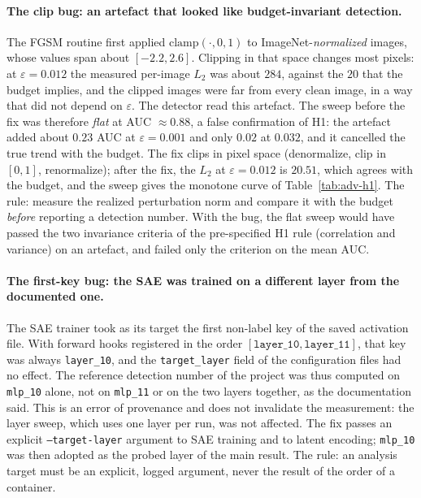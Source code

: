 \documentclass[../ppgc-tese.tex]{subfiles}
\begin{document}
\paragraph*{The clip bug: an artefact that looked like budget-invariant
detection.}
The FGSM routine first applied $\mathrm{clamp}(\cdot, 0, 1)$ to
ImageNet-\emph{normalized} images, whose values span about $[-2.2, 2.6]$.
Clipping in that space changes most pixels: at $\varepsilon{=}0.012$ the
measured per-image $L_2$ was about $284$, against the $20$ that the budget
implies, and the clipped images were far from every clean image, in a way that
did not depend on $\varepsilon$. The detector read this artefact. The sweep
before the fix was therefore \emph{flat} at AUC $\approx 0.88$, a false
confirmation of H1: the artefact added about $0.23$ AUC at
$\varepsilon{=}0.001$ and only $0.02$ at $0.032$, and it cancelled the true
trend with the budget.
The fix clips in pixel space (denormalize, clip in $[0,1]$, renormalize);
after the fix, the $L_2$ at $\varepsilon{=}0.012$ is $20.51$, which agrees
with the budget, and the sweep gives the monotone curve of
Table~\ref{tab:adv-h1}.
The rule: measure the realized perturbation norm and compare it with the
budget \emph{before} reporting a detection number. With the bug, the flat
sweep would have passed the two invariance criteria of the pre-specified H1
rule (correlation and variance) on an artefact, and failed only the criterion
on the mean AUC.

\paragraph*{The first-key bug: the SAE was trained on a different layer from
the documented one.}
The SAE trainer took as its target the first non-label key of the saved
activation file. With forward hooks registered in the order
$[\texttt{layer\_10}, \texttt{layer\_11}]$, that key was always
\texttt{layer\_10}, and the \texttt{target\_layer} field of the configuration
files had no effect.
The reference detection number of the project was thus computed on
\texttt{mlp\_10} alone, not on \texttt{mlp\_11} or on the two layers together,
as the documentation said. This is an error of provenance and does not
invalidate the measurement: the layer sweep, which uses one layer per run, was
not affected. The fix passes an explicit \texttt{--target-layer} argument to
SAE training and to latent encoding; \texttt{mlp\_10} was then adopted as the
probed layer of the main result.
The rule: an analysis target must be an explicit, logged argument, never the
result of the order of a container.
\end{document}
